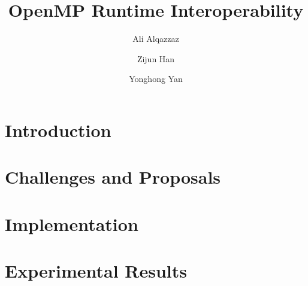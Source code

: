 \documentclass{llncs}
\begin{document}
%
\mainmatter              %
%
\title{OpenMP Runtime Interoperability} %
%
\author{Ali Alqazzaz \and Zijun Han \and Yonghong Yan}

%
%
%
\maketitle              %

\begin{abstract}

\end{abstract}
%

\section{Introduction}\label{sec:intro}


\section{Challenges and Proposals}
\label{sec:motivation}


\section{Implementation}
\label{sec:implementation}


\section{Experimental Results}
\label{sec:results}
 
%
\end{document}
